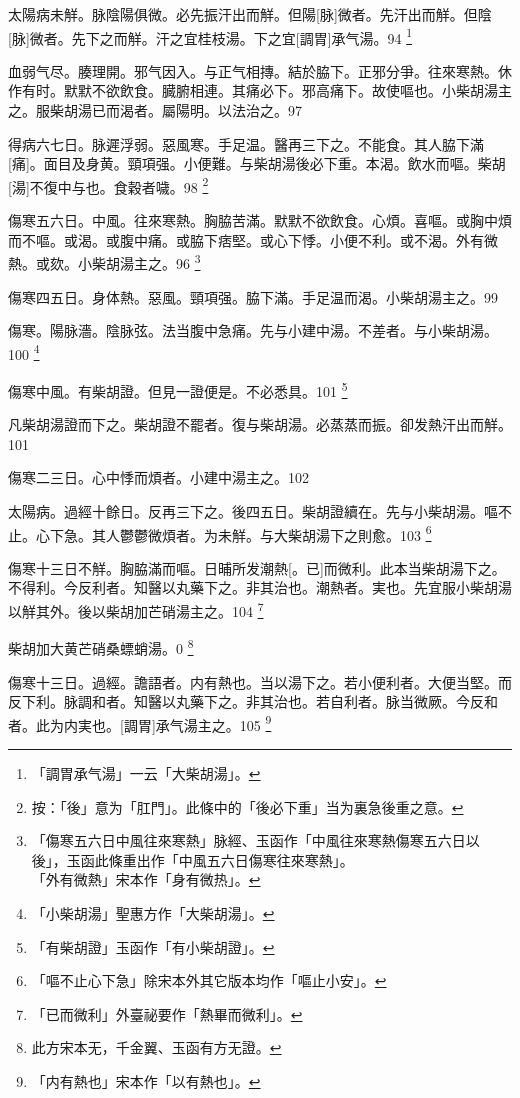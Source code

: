 \documentclass[12pt,twoside,UTF8,b5paper]{ctexbook}
\begin{document}
太陽病未觧。脉陰陽俱微。必先振汗出而觧。但陽[脉]微者。先汗出而觧。但陰[脉]微者。先下之而觧。汗之宜桂枝湯。下之宜[調胃]承气湯。94
	\footnote{「調胃承气湯」一云「大柴胡湯」。}

血弱气尽。腠理開。邪气因入。与正气相摶。結於脇下。正邪分爭。往來寒熱。休作有时。默默不欲飲食。臓腑相連。其痛必下。邪高痛下。故使嘔也。小柴胡湯主之。服柴胡湯已而渴者。屬陽明。以法治之。97

得病六七日。脉遲浮弱。惡風寒。手足温。醫再三下之。不能食。其人脇下滿[痛]。面目及身黄。頸項强。小便難。与柴胡湯後必下重。本渴。飲水而嘔。柴胡[湯]不復中与也。食穀者噦。98
	\footnote{按：「後」意为「肛門」。此條中的「後必下重」当为裏急後重之意。}

傷寒五六日。中風。往來寒熱。胸脇苦滿。默默不欲飲食。心煩。喜嘔。或胸中煩而不嘔。或渴。或腹中痛。或脇下痞堅。或心下悸。小便不利。或不渴。外有微熱。或欬。小柴胡湯主之。96
	\footnote{「傷寒五六日中風往來寒熱」脉經、玉函作「中風往來寒熱傷寒五六日以後」，玉函此條重出作「中風五六日傷寒往來寒熱」。\\「外有微熱」宋本作「身有微热」。}

傷寒四五日。身体熱。惡風。頸項强。脇下滿。手足温而渴。小柴胡湯主之。99

傷寒。陽脉濇。陰脉弦。法当腹中急痛。先与小建中湯。不差者。与小柴胡湯。100
	\footnote{「小柴胡湯」聖惠方作「大柴胡湯」。}

傷寒中風。有柴胡證。但見一證便是。不必悉具。101
	\footnote{「有柴胡證」玉函作「有小柴胡證」。}

凡柴胡湯證而下之。柴胡證不罷者。復与柴胡湯。必蒸蒸而振。卻发熱汗出而觧。101

傷寒二三日。心中悸而煩者。小建中湯主之。102

太陽病。過經十餘日。反再三下之。後四五日。柴胡證續在。先与小柴胡湯。嘔不止。心下急。其人鬱鬱微煩者。为未觧。与大柴胡湯下之則愈。103
	\footnote{「嘔不止心下急」除宋本外其它版本均作「嘔止小安」。}

傷寒十三日不觧。胸脇滿而嘔。日晡所发潮熱[。已]而微利。此本当柴胡湯下之。不得利。今反利者。知醫以丸藥下之。非其治也。潮熱者。実也。先宜服小柴胡湯以觧其外。後以柴胡加芒硝湯主之。104
	\footnote{「已而微利」外臺祕要作「熱畢而微利」。}

柴胡加大黄芒硝桑螵蛸湯。0
	\footnote{此方宋本无，千金翼、玉函有方无證。}

傷寒十三日。過經。譫語者。内有熱也。当以湯下之。若小便利者。大便当堅。而反下利。脉調和者。知醫以丸藥下之。非其治也。若自利者。脉当微厥。今反和者。此为内実也。[調胃]承气湯主之。105
	\footnote{「内有熱也」宋本作「以有熱也」。}
\end{document}
